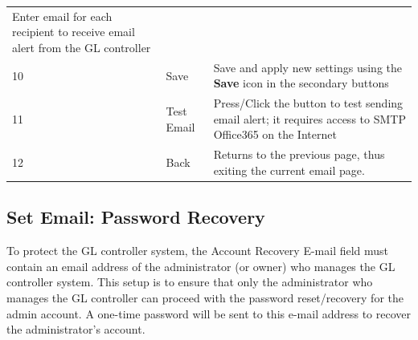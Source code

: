 \begin{longtable}[]{@{}lll@{}}
\begin{minipage}[t]{0.49\columnwidth}
Enter email for each recipient to receive email alert from the GL
controller\strut
\end{minipage}\tabularnewline
\begin{minipage}[t]{0.19\columnwidth}\raggedright
10\strut
\end{minipage} & \begin{minipage}[t]{0.23\columnwidth}\raggedright
Save\strut
\end{minipage} & \begin{minipage}[t]{0.49\columnwidth}\raggedright
Save and apply new settings using the \textbf{Save} icon in the
secondary buttons\strut
\end{minipage}\tabularnewline
\begin{minipage}[t]{0.19\columnwidth}\raggedright
11\strut
\end{minipage} & \begin{minipage}[t]{0.23\columnwidth}\raggedright
Test Email\strut
\end{minipage} & \begin{minipage}[t]{0.49\columnwidth}\raggedright
Press/Click the button to test sending email alert; it requires access
to SMTP Office365 on the Internet\strut
\end{minipage}\tabularnewline
\begin{minipage}[t]{0.19\columnwidth}\raggedright
12\strut
\end{minipage} & \begin{minipage}[t]{0.23\columnwidth}\raggedright
Back\strut
\end{minipage} & \begin{minipage}[t]{0.49\columnwidth}\raggedright
Returns to the previous page, thus exiting the current email page.\strut
\end{minipage}\tabularnewline
\bottomrule
\end{longtable}

\pagebreak 

\subsection{Set Email: Password
Recovery}

To protect the GL controller system, the Account Recovery E-mail field
must contain an email address of the administrator (or owner) who
manages the GL controller system. This setup is to ensure that only the
administrator who manages the GL controller can proceed with the
password reset/recovery for the admin account. A one-time password will
be sent to this e-mail address to recover the administrator's account.

